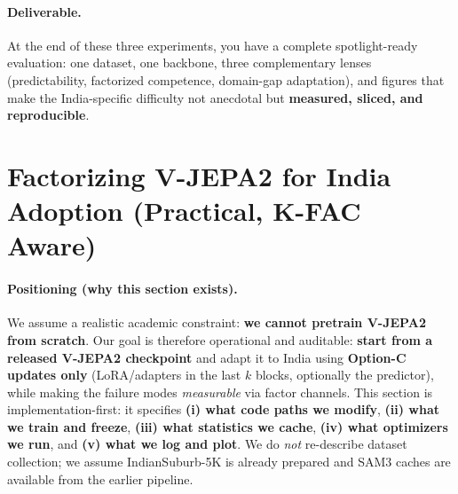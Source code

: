 \paragraph{Deliverable.}
At the end of these three experiments, you have a complete spotlight-ready evaluation: one dataset, one backbone, three complementary lenses (predictability, factorized competence, domain-gap adaptation), and figures that make the India-specific difficulty not anecdotal but \textbf{measured, sliced, and reproducible}.































\section{Factorizing V-JEPA2 for India Adoption (Practical, K-FAC Aware)}
\label{sec:factorize_vjepa2_india_practical_kfac}

\paragraph{Positioning (why this section exists).}
We assume a realistic academic constraint: \textbf{we cannot pretrain V-JEPA2 from scratch}. Our goal is therefore operational and auditable: \textbf{start from a released V-JEPA2 checkpoint} and adapt it to India using \textbf{Option-C updates only} (LoRA/adapters in the last $k$ blocks, optionally the predictor), while making the failure modes \emph{measurable} via factor channels. This section is implementation-first: it specifies \textbf{(i) what code paths we modify}, \textbf{(ii) what we train and freeze}, \textbf{(iii) what statistics we cache}, \textbf{(iv) what optimizers we run}, and \textbf{(v) what we log and plot}. We do \emph{not} re-describe dataset collection; we assume IndianSuburb-5K is already prepared and SAM3 caches are available from the earlier pipeline.

\vspace{4pt}
